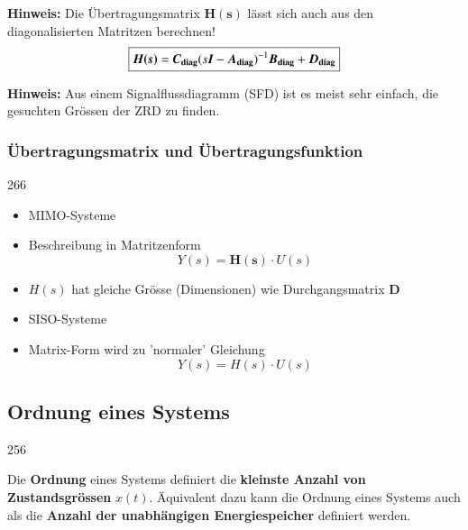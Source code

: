 \textbf{Hinweis:} Die Übertragungsmatrix $\bm{H(s)}$ lässt sich auch aus den diagonalisierten Matritzen berechnen!
$$ \boxed{ \bm{H(s)} = \bm{C_{\rm diag}}(s \bm{I} - \bm{A_{\rm diag}})^{-1} \bm{B_{\rm diag}} + \bm{D_{\rm diag}} } $$

\textbf{Hinweis:} Aus einem Signalflussdiagramm (SFD) ist es meist sehr einfach, die gesuchten Grössen der ZRD zu finden.


\subsubsection{Übertragungsmatrix und Übertragungsfunktion}{266}

\begin{minipage}[t]{0.48\columnwidth}
    \begin{center}
        \textbf{}
    \end{center}
    \begin{itemize}
        \item MIMO-Systeme
        \item Beschreibung in Matritzenform
            $$ Y(s) = \bm{H(s)} \cdot U(s) $$
        \item  $H(s)$ hat gleiche Grösse (Dimensionen) wie Durchgangsmatrix $\bm{D}$
    \end{itemize}
\end{minipage}
\hfill
\begin{minipage}[t]{0.48\columnwidth}
    \begin{center}
        \textbf{}
    \end{center}
        \begin{itemize}
            \item SISO-Systeme
            \item Matrix-Form wird zu 'normaler' Gleichung
            $$ Y(s) = H(s) \cdot U(s) $$
        \end{itemize}
\end{minipage}


\subsection{Ordnung eines Systems}{256}

Die \textbf{Ordnung} eines Systems definiert die \textbf{kleinste Anzahl von Zustandsgrössen} $x(t)$.
Äquivalent dazu kann die Ordnung eines Systems auch als die \textbf{Anzahl der unabhängigen Energiespeicher} definiert werden.



